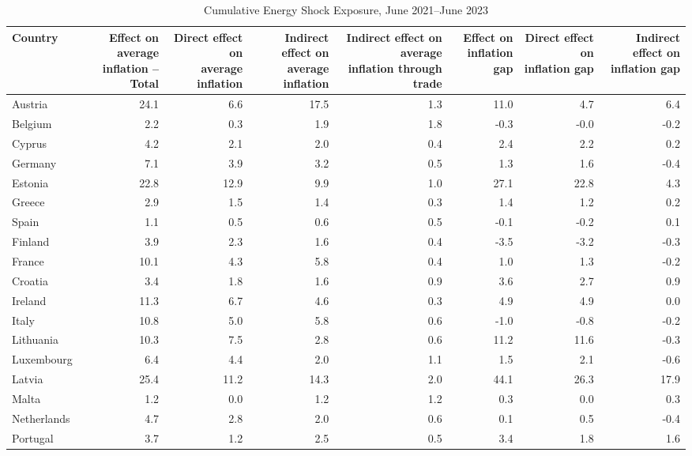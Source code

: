 \begin{table}[H]
\centering
\caption{Cumulative Energy Shock Exposure, June 2021--June 2023}
\scriptsize
\setlength{\tabcolsep}{1.2pt}
\begin{tabular}{lrrrrrrr}
\toprule
Country & \shortstack{Effect on average\\inflation -- Total} & \shortstack{Direct effect on\\average inflation} & \shortstack{Indirect effect on\\average inflation} & \shortstack{Indirect effect on average\\inflation through trade} & \shortstack{Effect on\\inflation gap} & \shortstack{Direct effect on\\inflation gap} & \shortstack{Indirect effect on\\inflation gap}
 \\
\midrule
Austria & 24.1 & 6.6 & 17.5 & 1.3 & 11.0 & 4.7 & 6.4
 \\
Belgium & 2.2 & 0.3 & 1.9 & 1.8 & -0.3 & -0.0 & -0.2
 \\
Cyprus & 4.2 & 2.1 & 2.0 & 0.4 & 2.4 & 2.2 & 0.2
 \\
Germany & 7.1 & 3.9 & 3.2 & 0.5 & 1.3 & 1.6 & -0.4
 \\
Estonia & 22.8 & 12.9 & 9.9 & 1.0 & 27.1 & 22.8 & 4.3
 \\
Greece & 2.9 & 1.5 & 1.4 & 0.3 & 1.4 & 1.2 & 0.2
 \\
Spain & 1.1 & 0.5 & 0.6 & 0.5 & -0.1 & -0.2 & 0.1
 \\
Finland & 3.9 & 2.3 & 1.6 & 0.4 & -3.5 & -3.2 & -0.3
 \\
France & 10.1 & 4.3 & 5.8 & 0.4 & 1.0 & 1.3 & -0.2
 \\
Croatia & 3.4 & 1.8 & 1.6 & 0.9 & 3.6 & 2.7 & 0.9
 \\
Ireland & 11.3 & 6.7 & 4.6 & 0.3 & 4.9 & 4.9 & 0.0
 \\
Italy & 10.8 & 5.0 & 5.8 & 0.6 & -1.0 & -0.8 & -0.2
 \\
Lithuania & 10.3 & 7.5 & 2.8 & 0.6 & 11.2 & 11.6 & -0.3
 \\
Luxembourg & 6.4 & 4.4 & 2.0 & 1.1 & 1.5 & 2.1 & -0.6
 \\
Latvia & 25.4 & 11.2 & 14.3 & 2.0 & 44.1 & 26.3 & 17.9
 \\
Malta & 1.2 & 0.0 & 1.2 & 1.2 & 0.3 & 0.0 & 0.3
 \\
Netherlands & 4.7 & 2.8 & 2.0 & 0.6 & 0.1 & 0.5 & -0.4
 \\
Portugal & 3.7 & 1.2 & 2.5 & 0.5 & 3.4 & 1.8 & 1.6

\end{tabular}
\end{table}
